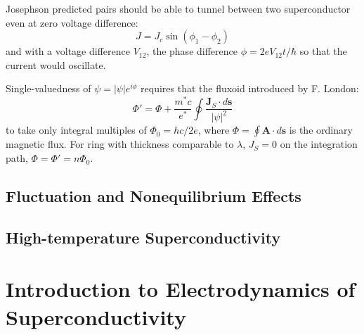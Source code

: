 \documentclass[8pt,a4paper,twocolumn]{article} %
\numberwithin{equation}{section} %
\begin{document}
			Josephson predicted pairs should be able to tunnel between two superconductor even at zero voltage difference:
			\begin{equation}
				J=J_c \sin (\phi_1- \phi_2)
			\end{equation}
			and with a voltage difference $V_{12}$, the phase difference $\phi = 2eV_{12}t/\hbar $ so that the current would oscillate.

			Single-valuedness of $\psi = |\psi| e^{i \phi} $ requires that the fluxoid introduced by F. London:
			\begin{equation}
				\Phi'=\Phi+\frac{m^* c}{e^*} \oint \frac{\bm J_S \cdot d \bm s}{|\psi|^2}
			\end{equation}
			to take only integral multiples of $\Phi_0 = hc/2e $, where $\Phi = \oint \bm A\cdot d\bm s$ is the ordinary magnetic flux. For ring with thickness comparable to $\lambda$, $J_S=0$ on the integration path, $\Phi=\Phi'=n \Phi_0$.

		\subsection{Fluctuation and Nonequilibrium Effects} %
		\label{sub:fluctuation_and_nonequilibrium_effects}
			

		\subsection{High-temperature Superconductivity} %
		\label{sub:high_temperature_superconductivity}
		


	\section{Introduction to Electrodynamics of Superconductivity} %
	\label{sec:intro_to_electrodynamics_of_superconductivity}
	
\end{document}
